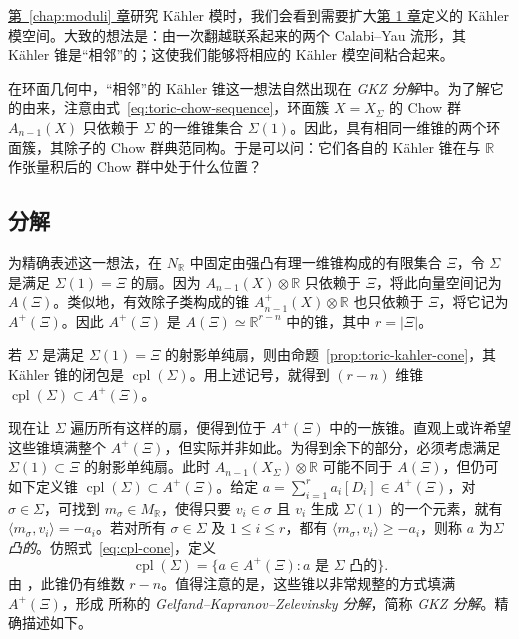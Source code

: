 \hyperref[chap:moduli]{第~\ref*{chap:moduli} 章}研究 Kähler 模时，我们会看到需要扩大\hyperref[chap:introduction]{第 1 章}定义的 Kähler 模空间。大致的想法是：由一次翻越联系起来的两个 Calabi--Yau 流形，其 Kähler 锥是“相邻”的；这使我们能够将相应的 Kähler 模空间粘合起来。

在环面几何中，“相邻”的 Kähler 锥这一想法自然出现在 \emph{GKZ 分解}中。为了解它的由来，注意由式~\eqref{eq:toric-chow-sequence}，环面簇 $X=X_\Sigma$ 的 Chow 群 $A_{n-1}(X)$ 只依赖于 $\Sigma$ 的一维锥集合 $\Sigma(1)$。因此，具有相同一维锥的两个环面簇，其除子的 Chow 群典范同构。于是可以问：它们各自的 Kähler 锥在与 $\mathbb R$ 作张量积后的 Chow 群中处于什么位置？

\subsection{分解}\label{subsec:gkz-cones}

为精确表述这一想法，在 $N_{\mathbb R}$ 中固定由强凸有理一维锥构成的有限集合 $\Xi$，令 $\Sigma$ 是满足 $\Sigma(1)=\Xi$ 的扇。因为 $A_{n-1}(X)\otimes\mathbb R$ 只依赖于 $\Xi$，将此向量空间记为 $A(\Xi)$。类似地，有效除子类构成的锥 $A^+_{n-1}(X)\otimes\mathbb R$ 也只依赖于 $\Xi$，将它记为 $A^+(\Xi)$。因此 $A^+(\Xi)$ 是 $A(\Xi)\simeq\mathbb R^{r-n}$ 中的锥，其中 $r=|\Xi|$。

若 $\Sigma$ 是满足 $\Sigma(1)=\Xi$ 的射影单纯扇，则由命题~\ref{prop:toric-kahler-cone}，其 Kähler 锥的闭包是 $\operatorname{cpl}(\Sigma)$。用上述记号，就得到 $(r-n)$ 维锥 $\operatorname{cpl}(\Sigma)\subset A^+(\Xi)$。

现在让 $\Sigma$ 遍历所有这样的扇，便得到位于 $A^+(\Xi)$ 中的一族锥。直观上或许希望这些锥填满整个 $A^+(\Xi)$，但实际并非如此。为得到余下的部分，必须考虑满足 $\Sigma(1)\subset\Xi$ 的射影单纯扇。此时 $A_{n-1}(X_\Sigma)\otimes\mathbb R$ 可能不同于 $A(\Xi)$，但仍可如下定义锥 $\operatorname{cpl}(\Sigma)\subset A^+(\Xi)$。给定 $a=\sum_{i=1}^r a_i[D_i]\in A^+(\Xi)$，对 $\sigma\in\Sigma$，可找到 $m_\sigma\in M_{\mathbb R}$，使得只要 $v_i\in\sigma$ 且 $v_i$ 生成 $\Sigma(1)$ 的一个元素，就有 $\langle m_\sigma,v_i\rangle=-a_i$。若对所有 $\sigma\in\Sigma$ 及 $1\leq i\leq r$，都有 $\langle m_\sigma,v_i\rangle\geq-a_i$，则称 $a$ 为\emph{$\Sigma$ 凸的}。仿照式~\eqref{eq:cpl-cone}，定义
\[
\operatorname{cpl}(\Sigma)=
\{a\in A^+(\Xi):a\text{ 是 }\Sigma\text{ 凸的}\}.
\]
由 ，此锥仍有维数 $r-n$。值得注意的是，这些锥以非常规整的方式填满 $A^+(\Xi)$，形成  所称的 \emph{Gelfand--Kapranov--Zelevinsky 分解}，简称 \emph{GKZ 分解}。精确描述如下。

